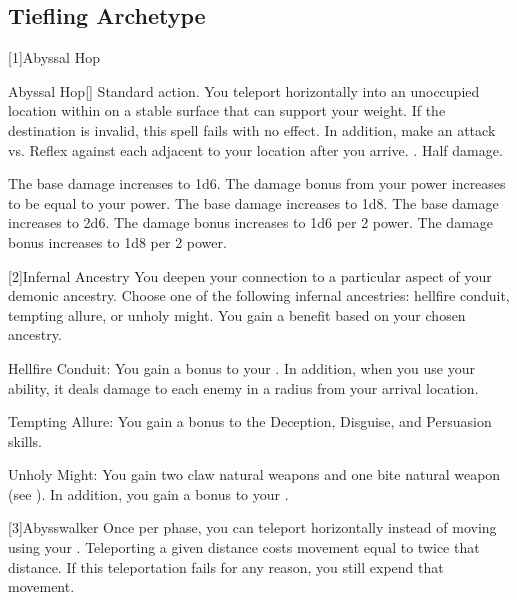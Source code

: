  \subsection{Tiefling Archetype}
    [1]{Abyssal Hop}
      \begin{magicalactiveability}{Abyssal Hop}[\atFire]
        \abilityusagetime Standard action.
        \rankline
        You teleport horizontally into an unoccupied location within \shortrange on a stable surface that can support your weight.
        If the destination is invalid, this spell fails with no effect.
        In addition, make an attack vs. Reflex against each  adjacent to your location after you arrive.
        \hit \damagerankzero.
        \miss Half damage.

        \rankline
         The base damage increases to 1d6.
         The damage bonus from your power increases to be equal to your power.
         The base damage increases to 1d8.
         The base damage increases to 2d6.
         The damage bonus increases to 1d6 per 2 power.
         The damage bonus increases to 1d8 per 2 power.
      \end{magicalactiveability}

    [2]{Infernal Ancestry} You deepen your connection to a particular aspect of your demonic ancestry.
      Choose one of the following infernal ancestries: hellfire conduit, tempting allure, or unholy might.
      You gain a benefit based on your chosen ancestry.
      \begin{raggeditemize}
        \item Hellfire Conduit: You gain a  bonus to your .
          In addition, when you use your  ability, it deals damage to each enemy in a \smallarea radius from your arrival location.
        \item Tempting Allure: You gain a  bonus to the Deception, Disguise, and Persuasion skills.
        \item Unholy Might: You gain two claw natural weapons and one bite natural weapon (see ).
          In addition, you gain a  bonus to your .
      \end{raggeditemize}

    [3]{Abysswalker} Once per phase, you can teleport horizontally instead of moving using your .
    Teleporting a given distance costs movement equal to twice that distance.
    If this teleportation fails for any reason, you still expend that movement.

